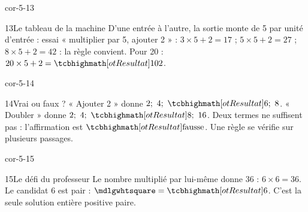 \begin{blocLivre}{cor-5-13}\begin{corrige}{13}{Le tableau de la machine}
D’une entrée à l’autre, la sortie monte de 5 par unité d’entrée : essai « multiplier par 5, ajouter 2 » : $3\times5+2=17$ ; $5\times5+2=27$ ; $8\times5+2=42$ : la règle convient. Pour 20 : $20\times5+2=\res{102}$.
\end{corrige}\end{blocLivre}
\begin{blocLivre}{cor-5-14}\begin{corrige}{14}{Vrai ou faux ?}
« Ajouter 2 » donne $2 ;\ 4 ;\ \res6 ;\ 8$. « Doubler » donne $2 ;\ 4 ;\ \res8 ;\ 16$. Deux termes ne suffisent pas : l’affirmation est $\res{\text{fausse}}$. Une règle se vérifie sur plusieurs passages.
\end{corrige}\end{blocLivre}
\begin{blocLivre}{cor-5-15}\begin{corrige}{15}{Le défi du professeur}
Le nombre multiplié par lui-même donne 36 : $6\times6=36$. Le candidat 6 est pair : $\square=\res6$. C’est la seule solution entière positive paire.
\end{corrige}\end{blocLivre}
